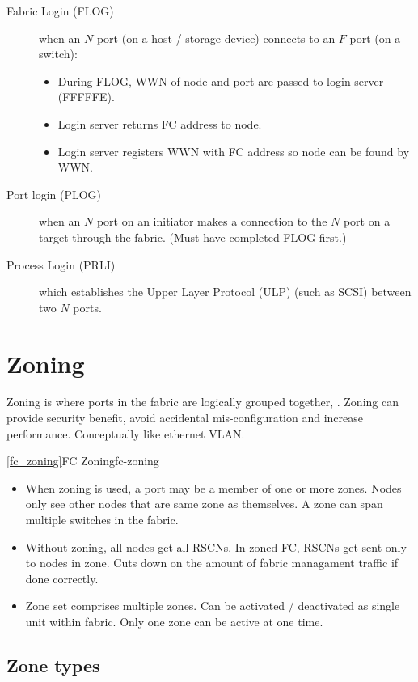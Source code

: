 \begin{description}
\item[Fabric Login (FLOG)]
when an \(N\) port (on a host / storage device) connects to an \(F\)
port (on a switch):

\begin{itemize}
\item
  During FLOG, WWN of node and port are passed to login server (FFFFFE).
\item
  Login server returns FC address to node.
\item
  Login server registers WWN with FC address so node can be found by
  WWN.
\end{itemize}
\item[Port login (PLOG)]
when an \(N\) port on an initiator makes a connection to the \(N\) port
on a target through the fabric. (Must have completed FLOG first.)
\item[Process Login (PRLI)]
which establishes the Upper Layer Protocol (ULP) (such as SCSI) between
two \(N\) ports.
\end{description}

\section{Zoning}
\label{sec:zoning}

Zoning is where ports in the fabric are logically grouped together, .
Zoning can provide security benefit, avoid accidental mis-configuration
and increase performance. Conceptually like ethernet VLAN.

\autoref{fc_zoning}{FC Zoning}{fc-zoning}

\begin{itemize}
\item
  When zoning is used, a port may be a member of one or more zones.
  Nodes only see other nodes that are same zone as themselves. A zone
  can span multiple switches in the fabric.
\item
  Without zoning, all nodes get all RSCNs. In zoned FC, RSCNs get sent
  only to nodes in zone. Cuts down on the amount of fabric managament
  traffic if done correctly.
\item
  Zone set comprises multiple zones. Can be activated / deactivated as
  single unit within fabric. Only one zone can be active at one time.
\end{itemize}

\subsection{Zone types}
\label{sec:zone-types}

